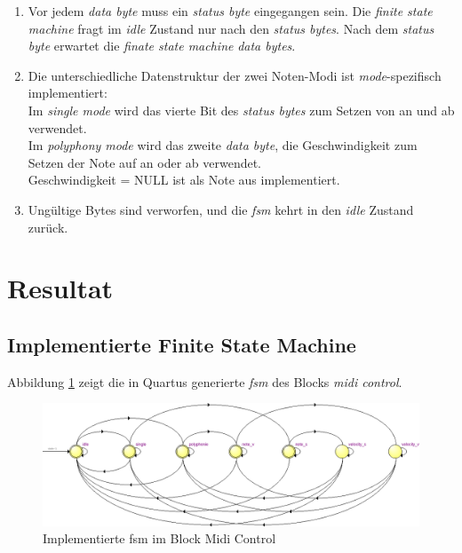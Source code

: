 \begin{enumerate}
\item Vor jedem \textit{data byte} muss ein \textit{status byte} eingegangen sein. Die \textit{finite state machine} fragt im \textit{idle} Zustand nur nach den \textit{status bytes}. Nach dem \textit{status byte} erwartet die \textit{finate state machine} \textit{data bytes}. 
\item Die unterschiedliche Datenstruktur der zwei Noten-Modi ist \textit{mode}-spezifisch implementiert:\\
Im \textit{single mode} wird das vierte Bit des \textit{status bytes} zum Setzen von an und ab verwendet.\\
Im \textit{polyphony mode} wird das zweite \textit{data byte}, die Geschwindigkeit zum Setzen der Note auf an oder ab verwendet.\\
Geschwindigkeit = NULL ist als Note aus implementiert.
\item Ungültige Bytes sind verworfen, und die \textit{fsm} kehrt in den   \textit{idle} Zustand zurück.
\end{enumerate}

\newpage
\section{Resultat}\label{sect.midi_resultat}

\subsection{Implementierte Finite State Machine}

Abbildung \ref{fig.midi_fsm_quartus_} zeigt die in Quartus generierte \textit{fsm} des Blocks \textit{midi control}.

\begin{figure}[H]
	\includegraphics[width=1\textwidth]{images/midi_control/fsm_midicontrol.png}
	\caption{Implementierte fsm im Block Midi Control}
	\label{fig.midi_fsm_quartus_}
\end{figure}

